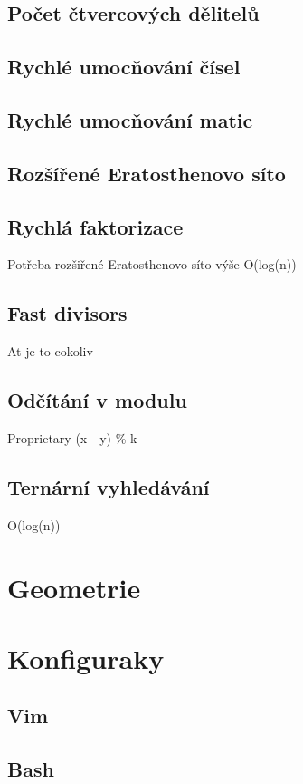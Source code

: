 \documentclass[10pt, a4paper, twoside]{article}
\begin{document}
\subsection{Počet čtvercových dělitelů}


\subsection{Rychlé umocňování čísel}



\subsection{Rychlé umocňování matic}


\subsection{Rozšířené Eratosthenovo síto}


\subsection{Rychlá faktorizace}
Potřeba rozšiřené Eratosthenovo síto výše
O(log(n))


\subsection{Fast divisors}
At je to cokoliv


\subsection{Odčítání v modulu}
Proprietary (x - y) \% k


\subsection{Ternární vyhledávání}
O(log(n))


\newpage

\section{Geometrie}


\section{Konfiguraky}
\subsection{Vim}

\subsection{Bash}

\end{document}
